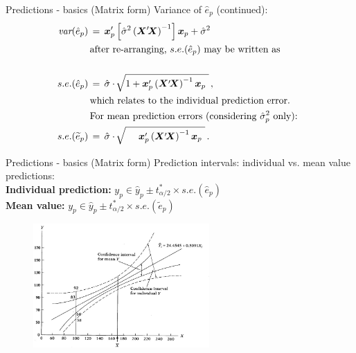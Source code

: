 \documentclass{beamer}
\begin{document}
\begin{frame}{Predictions - basics (Matrix form)}
Variance of $\hat{e}_p$ (continued):
\begin{equation*}
\begin{aligned}
\textit{var}(\hat{e}_p) \,&=\,
\bm{x}_{p}^\prime \left[ \hat{\sigma}^2 \left( \bm{X}^\prime \! \bm{X}  \right)^{-1} \right] \bm{x}_{p}
   + \hat{\sigma}^2\\
   & \textnormal{after re-arranging, $s.e.(\hat{e}_p)$ may be written as}\\
   &~\\
   s.e.(\hat{e}_p) \,&=\, \hat{\sigma} \cdot \,  
   \sqrt[]{1+ \bm{x}_{p}^\prime \left( \bm{X}^\prime \! \bm{X}  \right)^{-1} \bm{x}_{p}~} \,,\\
   &\textnormal{which relates to the individual prediction error. }\\
   &\textnormal{For mean prediction errors (considering $\hat{\sigma}_p^2$ only): }\\
   s.e.(\widetilde{e}_p) \,&=\, \hat{\sigma} \cdot \,  
   \sqrt[]{~~~~ \bm{x}_{p}^\prime \left( \bm{X}^\prime \! \bm{X}  \right)^{-1} \bm{x}_{p}~} \,.\\
\end{aligned}
\end{equation*}

\end{frame}

\begin{frame}{Predictions - basics (Matrix form)}
Prediction intervals: individual vs. mean value predictions:\\
\vspace{0.3cm}
\textbf{Individual prediction:} $y_p \in \hat{y}_p \pm t^*_{\alpha/2} \times s.e.(\hat{e}_p)$\\
\vspace{0.3cm}
\textbf{Mean value:} \hspace{1.7cm} $y_p \in \hat{y}_p \pm t^*_{\alpha/2} \times s.e.(\widetilde{e}_p)$

\begin{figure}
\includegraphics[width=0.6\textwidth]{img/P3_PredError.jpg}
\end{figure}

\end{frame}
\end{document}

